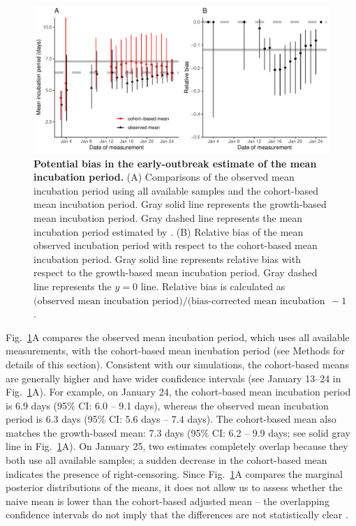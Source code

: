 \documentclass[12pt]{article}
\newcommand{\fref}[1]{Fig.~\ref{fig:#1}}
\begin{document}
\begin{figure}[!th]
\includegraphics[width=\textwidth]{figure_baker.pdf}
\caption{
\textbf{Potential bias in the early-outbreak estimate of the mean incubation period.}
(A) Comparisons of the observed mean incubation period using all available samples and the cohort-based mean incubation period.
Gray solid line represents the growth-based mean incubation period.
Gray dashed line represents the mean incubation period estimated by \cite{backer2020incubation}.
(B) Relative bias of the mean observed incubation period with respect to the cohort-based mean incubation period.
Gray solid line represents relative bias with respect to the growth-based mean incubation period.
Gray dashed line represents the $y=0$ line.
Relative bias is calculated as $\textrm{(observed mean incubation period)/(bias-corrected mean incubation period)} - 1$.
}
\label{fig:backer}
\end{figure}

\fref{backer}A compares the observed mean incubation period, which uses all available measurements, with the cohort-based mean incubation period (see Methods for details of this section).
Consistent with our simulations, the cohort-based means are generally higher and have wider confidence intervals (see January 13--24 in \fref{backer}A).
For example, on January 24, the cohort-based mean incubation period is 6.9 days (95\% CI: 6.0 -- 9.1 days), whereas the observed mean incubation period is 6.3 days (95\% CI: 5.6 days -- 7.4 days).
The cohort-based mean also matches the growth-based mean: 7.3 days (95\% CI: 6.2 -- 9.9 days; see solid gray line in \fref{backer}A).
On January 25, two estimates completely overlap because they both use all available samples; a sudden decrease in the cohort-based mean indicates the presence of right-censoring.
Since \fref{backer}A compares the marginal posterior distributions of the means, it does not allow us to assess whether the naive mean is lower than the cohort-based adjusted mean -- the overlapping confidence intervals do not imply that the differences are not statistically clear \citep{dushoff2019can}.
\end{document}
